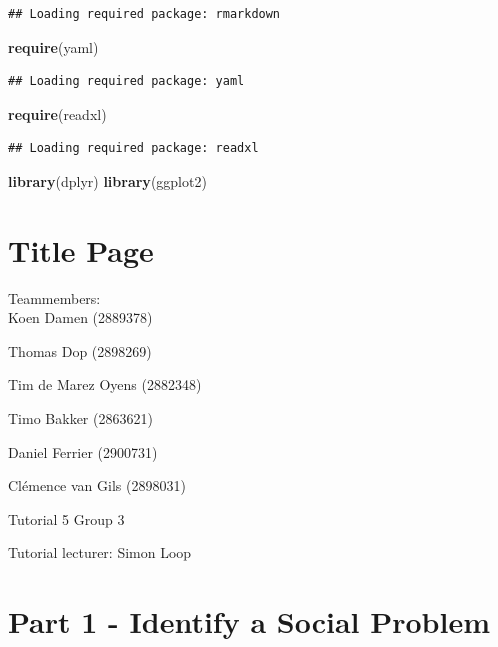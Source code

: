 \documentclass[
]{article}
\newenvironment{Shaded}{\begin{snugshade}}{\end{snugshade}}
\newcommand{\FunctionTok}[1]{\textcolor[rgb]{0.13,0.29,0.53}{\textbf{#1}}}
\newcommand{\NormalTok}[1]{#1}
\begin{document}
\begin{verbatim}
## Loading required package: rmarkdown
\end{verbatim}

\begin{Shaded}
\begin{Highlighting}[]
\FunctionTok{require}\NormalTok{(yaml)}
\end{Highlighting}
\end{Shaded}

\begin{verbatim}
## Loading required package: yaml
\end{verbatim}

\begin{Shaded}
\begin{Highlighting}[]
\FunctionTok{require}\NormalTok{(readxl)}
\end{Highlighting}
\end{Shaded}

\begin{verbatim}
## Loading required package: readxl
\end{verbatim}

\begin{Shaded}
\begin{Highlighting}[]
\FunctionTok{library}\NormalTok{(dplyr)}
\FunctionTok{library}\NormalTok{(ggplot2)}
\end{Highlighting}
\end{Shaded}

\section{Title Page}\label{title-page}

Teammembers:\\
Koen Damen (2889378)

Thomas Dop (2898269)

Tim de Marez Oyens (2882348)

Timo Bakker (2863621)

Daniel Ferrier (2900731)

Clémence van Gils (2898031)

Tutorial 5 Group 3

Tutorial lecturer: Simon Loop

\section{Part 1 - Identify a Social
Problem}\label{part-1---identify-a-social-problem}
\end{document}

